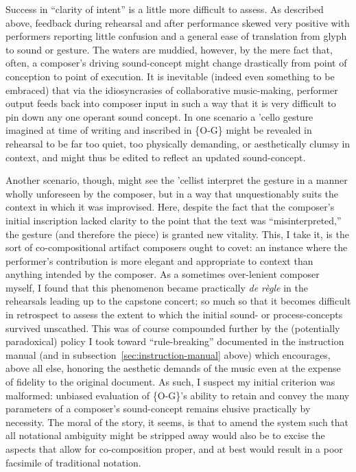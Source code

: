     Success in ``clarity of intent'' is a little more difficult to assess. As described above, feedback during rehearsal and after performance skewed very positive with performers reporting little confusion and a general ease of translation from glyph to sound or gesture. The waters are muddied, however, by the mere fact that, often, a composer's driving sound-concept might change drastically from point of conception to point of execution. It is inevitable (indeed even something to be embraced) that via the idiosyncrasies of collaborative music-making, performer output feeds back into composer input in such a way that it is very difficult to pin down any one operant sound concept. In one scenario a 'cello gesture imagined at time of writing and inscribed in \{O-G\} might be revealed in rehearsal to be far too quiet, too physically demanding, or aesthetically clumsy in context, and might thus be edited to reflect an updated sound-concept. 
    
    Another scenario, though, might see the 'cellist interpret the gesture in a manner wholly unforeseen by the composer, but in a way that unquestionably suits the context in which it was improvised. Here, despite the fact that the composer's initial inscription lacked clarity to the point that the text was ``misinterpreted,'' the gesture (and therefore the piece) is granted new vitality. This, I take it, is the sort of co-compositional artifact composers ought to covet: an instance where the performer's contribution is more elegant and appropriate to context than anything intended by the composer. As a sometimes over-lenient composer myself, I found that this phenomenon became practically \textit{de r\`{e}gle} in the rehearsals leading up to the capstone concert; so much so that it becomes difficult in retrospect to assess the extent to which the initial sound- or process-concepts survived unscathed. This was of course compounded further by the (potentially paradoxical) policy I took toward ``rule-breaking'' documented in the instruction manual (and in subsection~\ref{sec:instruction-manual} above) which encourages, above all else, honoring the aesthetic demands of the music even at the expense of fidelity to the original document. As such, I suspect my initial criterion was malformed: unbiased evaluation of \{O-G\}'s ability to retain and convey the many parameters of a composer's sound-concept remains elusive practically by necessity. The moral of the story, it seems, is that to amend the system such that all notational ambiguity might be stripped away would also be to excise the aspects that allow for co-composition proper, and at best would result in a poor facsimile of traditional notation.

